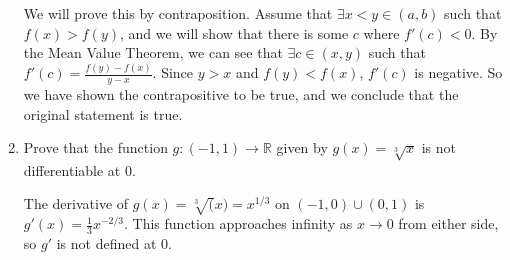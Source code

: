 \documentclass[11pt]{article}
\newcommand{\R}{\mathbb{R}}
\begin{document}
\begin{enumerate}
We will prove this by contraposition. Assume that $\exists x<y\in(a,b)$
such that $f(x)>f(y)$, and we will show that there is some $c$ where
$f'(c)<0$. By the Mean Value Theorem, we can see that $\exists c\in(x,y)$
such that $f'(c)=\frac{f(y)-f(x)}{y-x}$. Since $y>x$ and $f(y)<f(x)$,
$f'(c)$ is negative. So we have shown the contrapositive to be true,
and we conclude that the original statement is true.

\item{Prove that the function $g:(-1,1)\to\R$ given by $g(x)=\sqrt[3]{x}$
is not differentiable at 0.}

The derivative of $g(x)=\sqrt[3](x)=x^{1/3}$ on $(-1,0)\cup(0,1)$ is
$g'(x)=\frac{1}{3}x^{-2/3}$. This function approaches infinity
as $x\to0$ from either side, so $g'$ is not defined at 0.



\end{enumerate}
\end{document}

